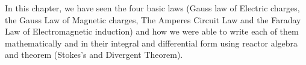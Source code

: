 In this chapter, we have seen the four basic laws (Gauss law of Electric charges, the Gauss Law of Magnetic charges, The Amperes Circuit Law and the Faraday Law of Electromagnetic induction) and how we were able to write each of them mathematically and in their integral and differential form using reactor algebra and theorem (Stokes's and Divergent Theorem).
